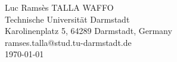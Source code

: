 \thispagestyle{fancy}

\vspace{0.2cm}

\begin{center}
\Large{\HeadTitleTwo}
\end{center}

\hspace{3cm}

\begin{center}
Luc Ramsès TALLA WAFFO \\
Technische Universität Darmstadt\\
Karolinenplatz 5, 64289 Darmstadt, Germany\\
ramses.talla@stud.tu-darmstadt.de\\
\vspace{0.5cm}
\today
\end{center}

